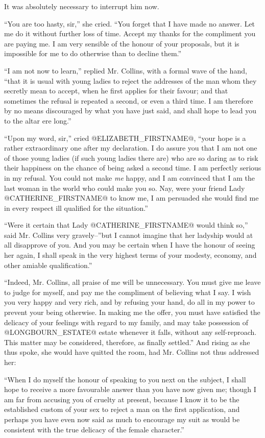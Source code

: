 It was absolutely necessary to interrupt him now.

``You are too hasty, sir,'' she cried. ``You forget that I have made no
answer. Let me do it without further loss of time. Accept my thanks for
the compliment you are paying me. I am very sensible of the honour of
your proposals, but it is impossible for me to do otherwise than to
decline them.''

``I am not now to learn,'' replied Mr. Collins, with a formal wave of the
hand, ``that it is usual with young ladies to reject the addresses of the
man whom they secretly mean to accept, when he first applies for their
favour; and that sometimes the refusal is repeated a second, or even a
third time. I am therefore by no means discouraged by what you have just
said, and shall hope to lead you to the altar ere long.''

``Upon my word, sir,'' cried @ELIZABETH_FIRSTNAME@, ``your hope is a rather
extraordinary one after my declaration. I do assure you that I am not
one of those young ladies (if such young ladies there are) who are so
daring as to risk their happiness on the chance of being asked a second
time. I am perfectly serious in my refusal. You could not make \textit{me}
happy, and I am convinced that I am the last woman in the world who
could make you so. Nay, were your friend Lady @CATHERINE_FIRSTNAME@ to know me, I
am persuaded she would find me in every respect ill qualified for the
situation.''

``Were it certain that Lady @CATHERINE_FIRSTNAME@ would think so,'' said Mr. Collins
very gravely--''but I cannot imagine that her ladyship would at all
disapprove of you. And you may be certain when I have the honour of
seeing her again, I shall speak in the very highest terms of your
modesty, economy, and other amiable qualification.''

``Indeed, Mr. Collins, all praise of me will be unnecessary. You
must give me leave to judge for myself, and pay me the compliment
of believing what I say. I wish you very happy and very rich, and by
refusing your hand, do all in my power to prevent your being otherwise.
In making me the offer, you must have satisfied the delicacy of your
feelings with regard to my family, and may take possession of @LONGBOURN_ESTATE@
estate whenever it falls, without any self-reproach. This matter may
be considered, therefore, as finally settled.'' And rising as she
thus spoke, she would have quitted the room, had Mr. Collins not thus
addressed her:

``When I do myself the honour of speaking to you next on the subject, I
shall hope to receive a more favourable answer than you have now given
me; though I am far from accusing you of cruelty at present, because I
know it to be the established custom of your sex to reject a man on
the first application, and perhaps you have even now said as much to
encourage my suit as would be consistent with the true delicacy of the
female character.''


